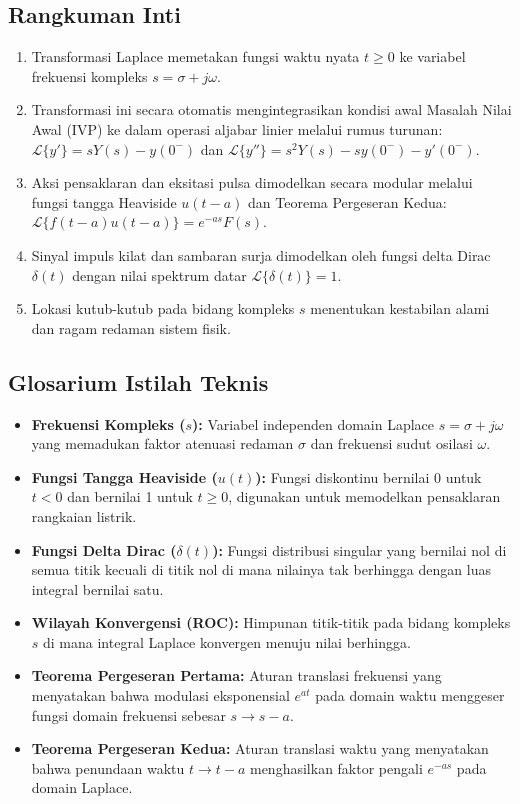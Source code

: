 \documentclass[11pt,a4paper]{article}
\theoremstyle{definition}
\begin{document}
\subsection{Rangkuman Inti}
\begin{enumerate}[leftmargin=*]
    \item Transformasi Laplace memetakan fungsi waktu nyata $t \ge 0$ ke variabel frekuensi kompleks $s = \sigma + j\omega$.
    \item Transformasi ini secara otomatis mengintegrasikan kondisi awal Masalah Nilai Awal (IVP) ke dalam operasi aljabar linier melalui rumus turunan: $\mathcal{L}\{y'\} = s Y(s) - y(0^-)$ dan $\mathcal{L}\{y''\} = s^2 Y(s) - s y(0^-) - y'(0^-)$.
    \item Aksi pensaklaran dan eksitasi pulsa dimodelkan secara modular melalui fungsi tangga Heaviside $u(t - a)$ dan Teorema Pergeseran Kedua: $\mathcal{L}\{f(t-a)u(t-a)\} = e^{-as} F(s)$.
    \item Sinyal impuls kilat dan sambaran surja dimodelkan oleh fungsi delta Dirac $\delta(t)$ dengan nilai spektrum datar $\mathcal{L}\{\delta(t)\} = 1$.
    \item Lokasi kutub-kutub pada bidang kompleks $s$ menentukan kestabilan alami dan ragam redaman sistem fisik.
\end{enumerate}

\subsection{Glosarium Istilah Teknis}
\begin{itemize}[leftmargin=*]
    \item \textbf{Frekuensi Kompleks ($s$):} Variabel independen domain Laplace $s = \sigma + j\omega$ yang memadukan faktor atenuasi redaman $\sigma$ dan frekuensi sudut osilasi $\omega$.
    \item \textbf{Fungsi Tangga Heaviside ($u(t)$):} Fungsi diskontinu bernilai 0 untuk $t < 0$ dan bernilai 1 untuk $t \ge 0$, digunakan untuk memodelkan pensaklaran rangkaian listrik.
    \item \textbf{Fungsi Delta Dirac ($\delta(t)$):} Fungsi distribusi singular yang bernilai nol di semua titik kecuali di titik nol di mana nilainya tak berhingga dengan luas integral bernilai satu.
    \item \textbf{Wilayah Konvergensi (ROC):} Himpunan titik-titik pada bidang kompleks $s$ di mana integral Laplace konvergen menuju nilai berhingga.
    \item \textbf{Teorema Pergeseran Pertama:} Aturan translasi frekuensi yang menyatakan bahwa modulasi eksponensial $e^{at}$ pada domain waktu menggeser fungsi domain frekuensi sebesar $s \to s - a$.
    \item \textbf{Teorema Pergeseran Kedua:} Aturan translasi waktu yang menyatakan bahwa penundaan waktu $t \to t - a$ menghasilkan faktor pengali $e^{-as}$ pada domain Laplace.
\end{itemize}
\end{document}
